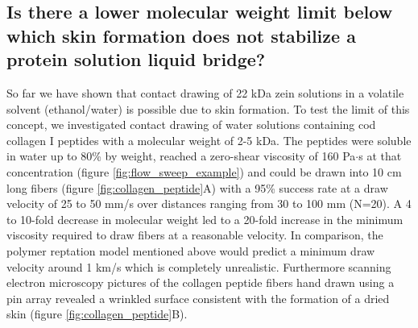 \documentclass[lineno]{JFM-FLM_Au}
\begin{document}
\subsection{Is there a lower molecular weight limit below which skin formation does not stabilize a protein solution liquid bridge?}
So far we have shown that contact drawing of 22 kDa zein solutions in a volatile solvent (ethanol/water) is possible due to skin formation. To test the limit of this concept, we investigated contact drawing of water solutions containing cod collagen I peptides with a molecular weight of 2-5 kDa. The peptides were soluble in water up to 80\% by weight, reached a zero-shear viscosity of 160 Pa$\cdot$s at that concentration (figure \ref{fig:flow_sweep_example}) and could be drawn into 10 cm long fibers (figure \ref{fig:collagen_peptide}A) with a 95\% success rate at a draw velocity of 25 to 50 mm/s over distances ranging from 30 to 100 mm (N=20). A 4 to 10-fold decrease in molecular weight led to a 20-fold increase in the minimum viscosity required to draw fibers at a reasonable velocity. In comparison, the polymer reptation model mentioned above would predict a minimum draw velocity around 1 km/s which is completely unrealistic. Furthermore scanning electron microscopy pictures of the collagen peptide fibers hand drawn using a pin array \cite{yaghoobi_multifilament_2023} revealed a wrinkled surface consistent with the formation of a dried skin (figure \ref{fig:collagen_peptide}B).
\end{document}
